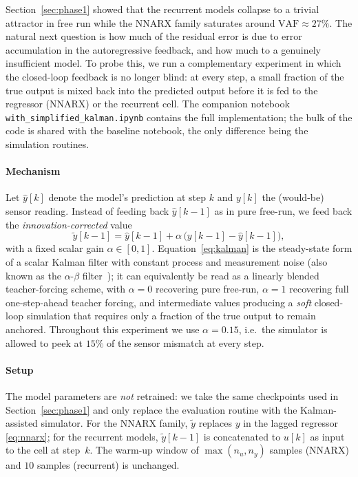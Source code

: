 \documentclass[conference]{IEEEtran}
\begin{document}
Section~\ref{sec:phase1} showed that the recurrent models collapse to
a trivial attractor in free run while the NNARX family saturates around
$\mathrm{VAF}\approx 27\%$. The natural next question is how much of
the residual error is due to error accumulation in the autoregressive
feedback, and how much to a genuinely insufficient model. To probe
this, we run a complementary experiment in which the closed-loop
feedback is no longer blind: at every step, a small fraction of the
true output is mixed back into the predicted output before it is fed
to the regressor (NNARX) or the recurrent cell. The companion notebook
\texttt{with\_simplified\_kalman.ipynb} contains the full
implementation; the bulk of the code is shared with the baseline
notebook, the only difference being the simulation routines.

\paragraph{Mechanism}
Let $\hat{y}[k]$ denote the model's prediction at step $k$ and
$y[k]$ the (would-be) sensor reading. Instead of feeding back
$\hat{y}[k-1]$ as in pure free-run, we feed back the
\emph{innovation-corrected} value
\begin{equation}
    \tilde{y}[k-1]
    = \hat{y}[k-1] + \alpha\,\big(y[k-1] - \hat{y}[k-1]\big),
    \label{eq:kalman}
\end{equation}
with a fixed scalar gain $\alpha\in[0,1]$. Equation~\eqref{eq:kalman}
is the steady-state form of a scalar Kalman filter with constant
process and measurement noise (also known as the
$\alpha$-$\beta$ filter~\cite{Brookner1998}); it can equivalently be
read as a linearly blended teacher-forcing scheme, with
$\alpha=0$ recovering pure free-run, $\alpha=1$ recovering full
one-step-ahead teacher forcing, and intermediate values producing a
\emph{soft} closed-loop simulation that requires only a fraction of
the true output to remain anchored. Throughout this experiment we use
$\alpha=0.15$, i.e.\ the simulator is allowed to peek at $15\%$ of the
sensor mismatch at every step.

\paragraph{Setup}
The model parameters are \emph{not} retrained: we take the same
checkpoints used in Section~\ref{sec:phase1} and only replace the
evaluation routine with the Kalman-assisted simulator. For the NNARX
family, $\tilde{y}$ replaces $y$ in the lagged regressor
\eqref{eq:nnarx}; for the recurrent models, $\tilde{y}[k-1]$ is
concatenated to $u[k]$ as input to the cell at step~$k$. The warm-up
window of $\max(n_u,n_y)$ samples (NNARX) and $10$ samples (recurrent)
is unchanged.
\end{document}
